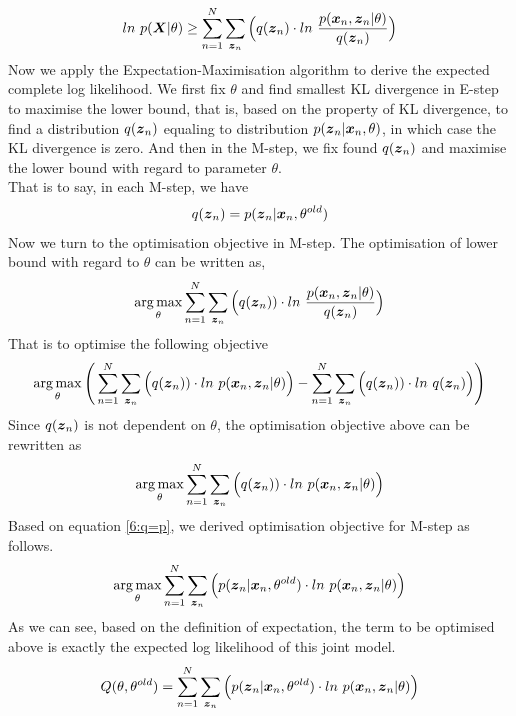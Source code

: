\documentclass[11pt,a4paper]{article}
\newcommand{\htab}{\hspace*{0.63cm}}
\newcommand{\bs}[1]{\boldsymbol{#1}}
\DeclareMathOperator*{\argmax}{arg\,max}
\begin{document}
\begin{align}
    ln\ p(\bs{X} | \theta) \geq
    \sumn  \sumzn \Big( q(\zn) \cdot ln\ \frac{p (\xn, \zn | \theta)}{q(\zn)} \Big) 
    \end{align}
\htab Now we apply the Expectation-Maximisation algorithm to derive the expected complete log
likelihood. We first fix $\theta$ and find smallest KL divergence in E-step to maximise the lower bound,
that is, based on the property of KL divergence, to find a distribution $q(\zn)$ equaling to
distribution $p(\zn | \xn, \theta)$, in which case the KL divergence is zero. 
And then in the M-step, we fix found $q(\zn)$ and maximise the lower bound with regard to 
parameter $\theta$. \\
\htab That is to say, in each M-step, we have 
\begin{align}
    q(\zn) = p(\zn | \xn, \theta^{old}) \label{6:q=p}
    \end{align}
\htab Now we turn to the optimisation objective in M-step. The optimisation of lower bound 
with regard to $\theta$ can be written as,
\begin{align}
    \argmax_{\theta} \sumn  \sumzn \Big( q(\zn)) 
        \cdot ln\ \frac{p (\xn, \zn | \theta)}{q(\zn)} \Big)
\end{align}
\htab That is to optimise the following objective
\begin{align}
    \argmax_{\theta} \Bigg( \sumn  \sumzn \Big( q(\zn)) \cdot ln\ p (\xn, \zn | \theta) \Big)
    -  \sumn  \sumzn \Big( q(\zn)) \cdot ln\ q(\zn) \Big) \Bigg)
    \end{align}
\htab Since $q (\zn)$ is not dependent on $\theta$, the optimisation objective above can be rewritten as
\begin{align}
    \argmax_{\theta} \sumn  \sumzn \Big( q(\zn)) 
        \cdot ln\ p (\xn, \zn | \theta) \Big)
    \end{align}
\htab Based on equation \eqref{6:q=p}, we derived optimisation objective for M-step as follows.
\begin{align}
    \argmax_{\theta} \sumn  \sumzn \Big(p(\zn | \xn, \theta^{old}) 
        \cdot ln\ p (\xn, \zn | \theta) \Big)
    \end{align}
\htab As we can see, based on the definition of expectation, the term to be optimised above
is exactly the expected log likelihood of this joint model.
\begin{align}
    Q(\theta, \theta^{old}) = \sumn  \sumzn \Big(p(\zn | \xn, \theta^{old}) 
        \cdot ln\ p (\xn, \zn | \theta) \Big)
    \end{align}
\newpage
\end{document}
